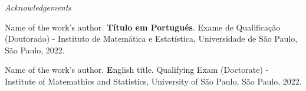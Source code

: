 \documentclass[11pt,oneside,a4paper]{book}
\newcommand{\autor}{Name of the work's author}
\newcommand{\tituloen}{English title}
\newcommand{\titulopt}{Título em Portugués}
\begin{document}
\afterpage{\blankpage}

\clearpage 
\thispagestyle{plain}
\begin{center}{\huge{\textit{Acknowledgements}} \par}\end{center}
\vspace{1em}
\lipsum[1]
\lipsum[1]
\vfil\vfil\null


\afterpage{\blankpage}
\clearpage %
 \thispagestyle{empty}
  \begin{flushleft}
    \setlength{\parskip}{0pt}
    { \par} 
    \bigskip
		\begin{center}
\noindent\begin{minipage}{0.75\textwidth}
\small{\autor. {\bfseries\titulopt}. 
Exame de Qualificação (Doutorado) - Instituto de Matemática e Estatística,
Universidade de São Paulo, São Paulo, 2022.}
\end{minipage}
\end{center}
\end{flushleft}
\bigskip


\afterpage{\blankpage}
\clearpage %
\thispagestyle{empty}
  \begin{flushleft}
    \setlength{\parskip}{0pt}
    { \par} 
    \bigskip
		\begin{center}
\noindent\begin{minipage}{0.75\textwidth}
\small{\autor. \textbf\tituloen. 
Qualifying Exam (Doctorate) - Institute of Matemathics and Statistics,
University of São Paulo, São Paulo, 2022.}
\end{minipage}
\end{center}
\end{flushleft}
\bigskip


\let\cleardoublepage\clearpage
\tableofcontents

\listoffigures %
\end{document}
